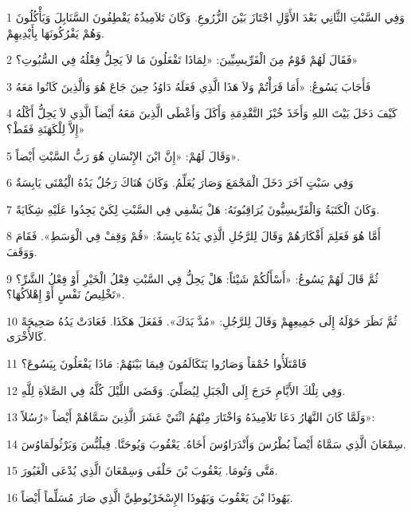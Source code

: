 \par 1 وَفِي السَّبْتِ الثَّانِي بَعْدَ الأَوَّلِ اجْتَازَ بَيْنَ الزُّرُوعِ. وَكَانَ تَلاَمِيذُهُ يَقْطِفُونَ السَّنَابِلَ وَيَأْكُلُونَ وَهُمْ يَفْرُكُونَهَا بِأَيْدِيهِمْ.
\par 2 فَقَالَ لَهُمْ قَوْمٌ مِنَ الْفَرِّيسِيِّينَ: «لِمَاذَا تَفْعَلُونَ مَا لاَ يَحِلُّ فِعْلُهُ فِي السُّبُوتِ؟»
\par 3 فَأَجَابَ يَسُوعُ: «أَمَا قَرَأْتُمْ وَلاَ هَذَا الَّذِي فَعَلَهُ دَاوُدُ حِينَ جَاعَ هُوَ وَالَّذِينَ كَانُوا مَعَهُ
\par 4 كَيْفَ دَخَلَ بَيْتَ اللهِ وَأَخَذَ خُبْزَ التَّقْدِمَةِ وَأَكَلَ وَأَعْطَى الَّذِينَ مَعَهُ أَيْضاً الَّذِي لاَ يَحِلُّ أَكْلُهُ إِلاَّ لِلْكَهَنَةِ فَقَطْ؟»
\par 5 وَقَالَ لَهُمْ: «إِنَّ ابْنَ الإِنْسَانِ هُوَ رَبُّ السَّبْتِ أَيْضاً».
\par 6 وَفِي سَبْتٍ آخَرَ دَخَلَ الْمَجْمَعَ وَصَارَ يُعَلِّمُ. وَكَانَ هُنَاكَ رَجُلٌ يَدُهُ الْيُمْنَى يَابِسَةٌ
\par 7 وَكَانَ الْكَتَبَةُ وَالْفَرِّيسِيُّونَ يُرَاقِبُونَهُ: هَلْ يَشْفِي فِي السَّبْتِ لِكَيْ يَجِدُوا عَلَيْهِ شِكَايَةً.
\par 8 أَمَّا هُوَ فَعَلِمَ أَفْكَارَهُمْ وَقَالَ لِلرَّجُلِ الَّذِي يَدُهُ يَابِسَةٌ: «قُمْ وَقِفْ فِي الْوَسَطِ». فَقَامَ وَوَقَفَ.
\par 9 ثُمَّ قَالَ لَهُمْ يَسُوعُ: «أَسْأَلُكُمْ شَيْئاً: هَلْ يَحِلُّ فِي السَّبْتِ فِعْلُ الْخَيْرِ أَوْ فِعْلُ الشَّرِّ؟ تَخْلِيصُ نَفْسٍ أَوْ إِهْلاَكُهَا؟».
\par 10 ثُمَّ نَظَرَ حَوْلَهُ إِلَى جَمِيعِهِمْ وَقَالَ لِلرَّجُلِ: «مُدَّ يَدَكَ». فَفَعَلَ هَكَذَا. فَعَادَتْ يَدُهُ صَحِيحَةً كَالأُخْرَى.
\par 11 فَامْتَلَأُوا حُمْقاً وَصَارُوا يَتَكَالَمُونَ فِيمَا بَيْنَهُمْ: مَاذَا يَفْعَلُونَ بِيَسُوعَ؟
\par 12 وَفِي تِلْكَ الأَيَّامِ خَرَجَ إِلَى الْجَبَلِ لِيُصَلِّيَ. وَقَضَى اللَّيْلَ كُلَّهُ فِي الصَّلاَةِ لِلَّهِ.
\par 13 وَلَمَّا كَانَ النَّهَارُ دَعَا تَلاَمِيذَهُ وَاخْتَارَ مِنْهُمُ اثْنَيْ عَشَرَ الَّذِينَ سَمَّاهُمْ أَيْضاً «رُسُلاً»:
\par 14 سِمْعَانَ الَّذِي سَمَّاهُ أَيْضاً بُطْرُسَ وَأَنْدَرَاوُسَ أَخَاهُ. يَعْقُوبَ وَيُوحَنَّا. فِيلُبُّسَ وَبَرْثُولَمَاوُسَ.
\par 15 مَتَّى وَتُومَا. يَعْقُوبَ بْنَ حَلْفَى وَسِمْعَانَ الَّذِي يُدْعَى الْغَيُورَ.
\par 16 يَهُوذَا بْنَ يَعْقُوبَ وَيَهُوذَا الإِسْخَرْيُوطِيَّ الَّذِي صَارَ مُسَلِّماً أَيْضاً.
